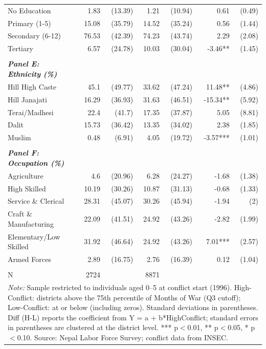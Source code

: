 \begin{landscape}
\begin{table}[!h]
{\begin{tabular}[t]{lrrrrrr}
No Education & 1.83 & (13.39) & 1.21 & (10.94) & 0.61 & (0.49)\\
Primary (1-5) & 15.08 & (35.79) & 14.52 & (35.24) & 0.56 & (1.44)\\
\addlinespace
Secondary (6-12) & 76.53 & (42.39) & 74.23 & (43.74) & 2.29 & (2.08)\\
Tertiary & 6.57 & (24.78) & 10.03 & (30.04) & -3.46** & (1.45)\\
 &  &  &  &  &  & \\
\em{\textbf{Panel E: Ethnicity (\%)}} & \em{\textbf{}} & \em{\textbf{}} & \em{\textbf{}} & \em{\textbf{}} & \em{\textbf{}} & \em{\textbf{}}\\
Hill High Caste & 45.1 & (49.77) & 33.62 & (47.24) & 11.48** & (4.86)\\
\addlinespace
Hill Janajati & 16.29 & (36.93) & 31.63 & (46.51) & -15.34** & (5.92)\\
Terai/Madhesi & 22.4 & (41.7) & 17.35 & (37.87) & 5.05 & (8.81)\\
Dalit & 15.73 & (36.42) & 13.35 & (34.02) & 2.38 & (1.85)\\
Muslim & 0.48 & (6.91) & 4.05 & (19.72) & -3.57*** & (1.01)\\
 &  &  &  &  &  & \\
\addlinespace
\em{\textbf{Panel F: Occupation (\%)}} & \em{\textbf{}} & \em{\textbf{}} & \em{\textbf{}} & \em{\textbf{}} & \em{\textbf{}} & \em{\textbf{}}\\
Agriculture & 4.6 & (20.96) & 6.28 & (24.27) & -1.68 & (1.38)\\
High Skilled & 10.19 & (30.26) & 10.87 & (31.13) & -0.68 & (1.33)\\
Service \& Clerical & 28.31 & (45.07) & 30.26 & (45.94) & -1.94 & (2)\\
Craft \& Manufacturing & 22.09 & (41.51) & 24.92 & (43.26) & -2.82 & (1.99)\\
\addlinespace
Elementary/Low Skilled & 31.92 & (46.64) & 24.92 & (43.26) & 7.01*** & (2.57)\\
Armed Forces & 2.89 & (16.75) & 2.76 & (16.39) & 0.12 & (1.04)\\
 &  &  &  &  &  & \\
N & 2724 &  & 8871 &  &  & \\
\bottomrule
\multicolumn{7}{l}{\rule{0pt}{1em}\textit{Note: } Sample restricted to individuals aged 0--5 at conflict start (1996). High-Conflict: districts above the 75th percentile of Months of War (Q3 cutoff); Low-Conflict: at or below (including zeros). Standard deviations in parentheses. Diff (H-L) reports the coefficient from Y = a + b*HighConflict; standard errors in parentheses are clustered at the district level. *** p$<$0.01, ** p$<$0.05, * p$<$0.10. Source: Nepal Labor Force Survey; conflict data from INSEC.}\\
\end{tabular}}
\end{table}
\end{landscape}
